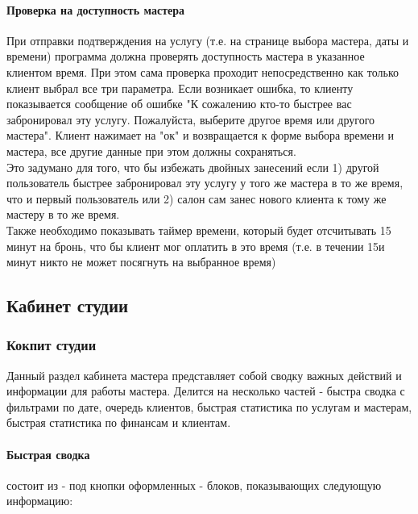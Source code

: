 \documentclass[DIV=calc, paper=a4, fontsize=11pt]{scrartcl} %
\begin{document}
\paragraph{Проверка на доступность мастера}
При отправки подтверждения на услугу (т.е. на странице выбора мастера, даты и времени) программа должна проверять доступность мастера в указанное клиентом время. При этом сама проверка проходит непосредственно как только клиент выбрал все три параметра. Если возникает ошибка, то клиенту показывается сообщение об ошибке "К сожалению кто-то быстрее вас забронировал эту услугу. Пожалуйста, выберите другое время или другого мастера". Клиент нажимает на "ок" и возвращается к форме выбора времени и мастера, все другие данные при этом должны сохраняться.
\\[0.5cm]
Это задумано для того, что бы избежать двойных занесений если 1) другой пользователь быстрее забронировал эту услугу у того же мастера в то же время, что и первый пользователь или 2) салон сам занес нового клиента к тому же мастеру в то же время.
\\[0.5cm]
Также необходимо показывать таймер времени, который будет отсчитывать 15 минут на бронь, что бы клиент мог оплатить в это время (т.е. в течении 15и минут никто не может посягнуть на выбранное время)


\subsection{Кабинет студии}

\subsubsection{Кокпит студии}
Данный раздел кабинета мастера представляет собой сводку важных действий и информации для работы мастера. Делится на несколько частей - быстра сводка с фильтрами по дате, очередь клиентов, быстрая статистика по услугам и мастерам, быстрая статистика по финансам и клиентам.

\paragraph{Быстрая сводка} 
состоит из - под кнопки оформленных - блоков, показывающих следующую информацию:
\end{document}
